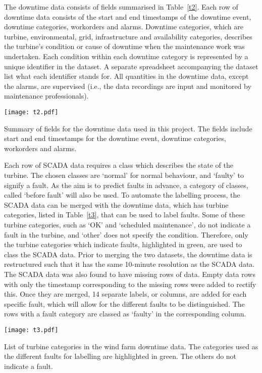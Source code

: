 The downtime data consists of fields summarised in Table~\ref{t2}. Each row of downtime data consists of the start and end timestamps of the downtime event, downtime categories, workorders and alarms. Downtime categories, which are turbine, environmental, grid, infrastructure and availability categories, describes the turbine's condition or cause of downtime when the maintenance work was undertaken. Each condition within each downtime category is represented by a unique identifier in the dataset. A separate spreadsheet accompanying the dataset list what each identifier stands for. All quantities in the downtime data, except the alarms, are supervised (i.e., the data recordings are input and monitored by maintenance professionals).

\begin{table}
    \centering
    \texttt{[image: t2.pdf]}
    \caption{\label{t2}Summary of fields for the downtime data used in this project. The fields include start and end timestamps for the downtime event, downtime categories, workorders and alarms.}
\end{table}

Each row of SCADA data requires a class which describes the state of the turbine. The chosen classes are `normal' for normal behaviour, and `faulty' to signify a fault. As the aim is to predict faults in advance, a category of classes, called `before fault' will also be used. To automate the labelling process, the SCADA data can be merged with the downtime data, which has turbine categories, listed in Table~\ref{t3}, that can be used to label faults. Some of these turbine categories, such as `OK' and `scheduled maintenance', do not indicate a fault in the turbine, and `other' does not specify the condition. Therefore, only the turbine categories which indicate faults, highlighted in green, are used to class the SCADA data. Prior to merging the two datasets, the downtime data is restructured such that it has the same 10-minute resolution as the SCADA data. The SCADA data was also found to have missing rows of data. Empty data rows with only the timestamp corresponding to the missing rows were added to rectify this. Once they are merged, 14 separate labels, or columns, are added for each specific fault, which will allow for the different faults to be distinguished. The rows with a fault category are classed as `faulty' in the corresponding column.

\begin{table}
    \centering
    \texttt{[image: t3.pdf]}
    \caption{\label{t3}List of turbine categories in the wind farm downtime data. The categories used as the different faults for labelling are highlighted in green. The others do not indicate a fault.}
\end{table}

